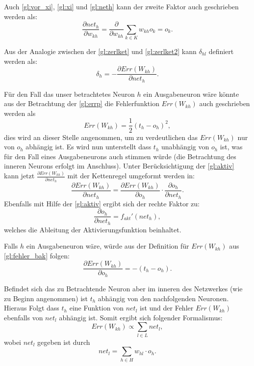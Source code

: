 Auch \autoref{gl:vor_xi}, \autoref{gl:xi} und \autoref{gl:neth} kann der zweite Faktor auch geschrieben werden als:
\begin{equation}
\frac{\partial net_{h}}{\partial w_{kh}} = \frac{\partial }{\partial w_{kh}} \sum\limits_{k \in K} w_{kh} o_{k} = o_{k} .
\label{gl:ok_bak}
\end{equation}

Aus der Analogie zwischen der \autoref{gl:zerlket} und \autoref{gl:zerlket2} kann $\delta_{hl}$ definiert werden als:
\begin{equation}
\delta_{h}= -\frac{\partial Err(W_{kh})}{\partial net_{h}}  .
\label{gl:deltah_bak}
\end{equation}

Für den Fall das unser betrachtetes Neuron $h$ ein Ausgabeneuron wäre könnte aus der Betrachtung der \autoref{gl:errp} die Fehlerfunktion $Err(W_{kh})$ auch geschrieben werden als
\begin{equation}
Err(W_{kh})= \frac{1}{2} (t_{h}-o_{h})^2 ,
\label{gl:fehler_bak}
\end{equation}
dies wird an dieser Stelle angenommen, um zu verdeutlichen das $Err(W_{kh})$ nur von $o_{h}$ abhängig ist. Es wird nun unterstellt dass $t_h$ unabhängig von $o_h$ ist, was für den Fall eines Ausgabeneurons auch stimmen würde (die Betrachtung des inneren Neurons erfolgt im Anschluss). Unter Berücksichtigung der \autoref{gl:aktiv} kann jetzt $\frac{\partial Err(W_{kh})}{\partial net_{h}}$ mit der Kettenregel umgeformt werden in:
\begin{equation}
\frac{\partial Err(W_{kh})}{\partial net_{h}} = \frac{\partial Err(W_{kh})}{\partial o_{h}} \cdot \frac{\partial o_{h}}{\partial net_{h}}.
\label{gl:ohket_bak}
\end{equation}
Ebenfalls mit Hilfe der \autoref{gl:aktiv} ergibt sich der rechte Faktor zu:
\begin{equation}
\frac{\partial o_{h}}{\partial net_{h}} = f_{akt}'(net_h),
\label{gl:aktiv_neth_bak}
\end{equation}
welches die Ableitung der Aktivierungsfunktion beinhaltet.

Falls $h$ ein Ausgabeneuron wäre, würde aus der Definition für $Err(W_{kh})$ aus \autoref{gl:fehler_bak} folgen:
\begin{equation}
\frac{\partial Err(W_{kh})}{\partial o_{h}} = -(t_h - o_h).
\end{equation}

Befindet sich das zu Betrachtende Neuron aber im inneren des Netzwerkes (wie zu Beginn angenommen) ist $t_h$ abhängig von den nachfolgenden Neuronen. Hieraus Folgt dass $t_h$ eine Funktion von $net_l$ ist und der Fehler $Err(W_{kh})$ ebenfalls von $net_l$ abhängig ist. Somit ergibt sich folgender Formalismus:
\begin{equation*}
Err(W_{kh}) \propto \sum\limits_{l \in L} net_l,
\end{equation*}
wobei $net_l$ gegeben ist durch
\begin{equation}
net_{l} = \sum_{h \in H} w_{hl} \cdot o_{h} .
\label{gl:netl}
\end{equation}

